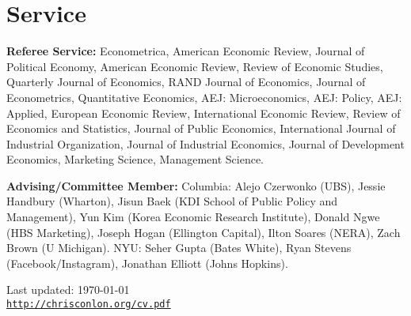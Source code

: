 \documentclass[letterpaper]{article}
\def\footerlink{http://chrisconlon.org/cv.pdf}
\renewenvironment{itemize}{
  \begin{list}{}{
    \setlength{\leftmargin}{1.5em}
  }
}{
  \end{list}
}
\begin{document}
\section*{Service}
\begin{itemize}
\item \textbf{Referee Service:} Econometrica, American Economic Review, Journal of Political Economy, American Economic Review, Review of Economic Studies, Quarterly Journal of Economics, RAND Journal of Economics, Journal of Econometrics, Quantitative Economics, AEJ: Microeconomics, AEJ: Policy, AEJ: Applied, European Economic Review, International Economic Review, Review of Economics and Statistics, Journal of Public Economics, International Journal of Industrial Organization, Journal of Industrial Economics, Journal of Development Economics, Marketing Science, Management Science.
\item \textbf{Advising/Committee Member:}  Columbia: Alejo Czerwonko (UBS), Jessie Handbury (Wharton), Jisun Baek (KDI School of Public Policy and Management), Yun Kim (Korea Economic Research Institute), Donald Ngwe (HBS Marketing), Joseph Hogan (Ellington Capital), Ilton Soares (NERA), Zach Brown (U Michigan). NYU: Seher Gupta (Bates White), Ryan Stevens (Facebook/Instagram), Jonathan Elliott (Johns Hopkins).
\end{itemize}

\bigskip

\begin{center}
  \begin{footnotesize}
    Last updated: \today \\
    \href{\footerlink}{\texttt{\footerlink}}
  \end{footnotesize}
\end{center}
\end{document}
